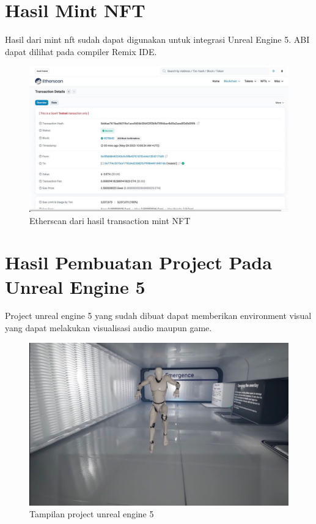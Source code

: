 \section{Hasil Mint NFT}
Hasil dari mint nft sudah dapat digunakan untuk integrasi Unreal Engine 5. ABI dapat dilihat pada compiler Remix IDE.
\begin{figure}[H]
  \centering

  \includegraphics[scale=0.3]{gambar/etherscan-deploy.jpg}

  \caption{Etherscan dari hasil transaction mint NFT}
  \label{fig:etherscandeploy}
\end{figure}

\section{Hasil Pembuatan Project Pada Unreal Engine 5}
Project unreal engine 5 yang sudah dibuat dapat memberikan environment visual yang dapat melakukan visualisasi audio maupun game.

\begin{figure}[H]
  \centering

  \includegraphics[scale=0.3]{gambar/ue5project.jpg}

  \caption{Tampilan project unreal engine 5}
  \label{fig:ue5project}
\end{figure}

